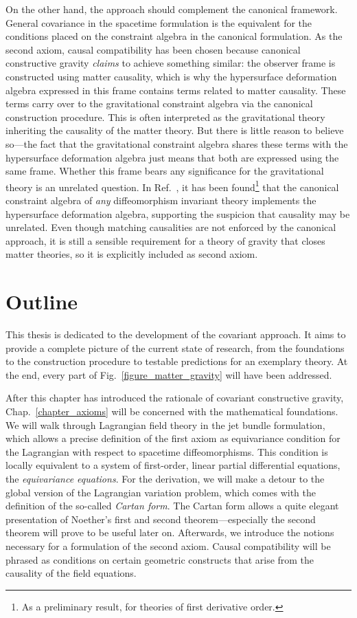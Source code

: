 On the other hand, the approach should complement the canonical framework. General covariance in the spacetime formulation is the equivalent for the conditions placed on the constraint algebra in the canonical formulation. As the second axiom, causal compatibility has been chosen because canonical constructive gravity \emph{claims} to achieve something similar: the observer frame is constructed using matter causality, which is why the hypersurface deformation algebra expressed in this frame contains terms related to matter causality. These terms carry over to the gravitational constraint algebra via the canonical construction procedure. This is often interpreted as the gravitational theory inheriting the causality of the matter theory. But there is little reason to believe so---the fact that the gravitational constraint algebra shares these terms with the hypersurface deformation algebra just means that both are expressed using the same frame. Whether this frame bears any significance for the gravitational theory is an unrelated question. In Ref.\ \cite{Reinhart_2019}, it has been found\footnote{As a preliminary result, for theories of first derivative order.} that the canonical constraint algebra of \emph{any} diffeomorphism invariant theory implements the hypersurface deformation algebra, supporting the suspicion that causality may be unrelated. Even though matching causalities are not enforced by the canonical approach, it is still a sensible requirement for a theory of gravity that closes matter theories, so it is explicitly included as second axiom.

\section{Outline}

This thesis is dedicated to the development of the covariant approach. It aims to provide a complete picture of the current state of research, from the foundations to the construction procedure to testable predictions for an exemplary theory. At the end, every part of Fig.~\ref{figure_matter_gravity} will have been addressed.

After this chapter has introduced the rationale of covariant constructive gravity, Chap.~\ref{chapter_axioms} will be concerned with the mathematical foundations. We will walk through Lagrangian field theory in the jet bundle formulation, which allows a precise definition of the first axiom as equivariance condition for the Lagrangian with respect to spacetime diffeomorphisms. This condition is locally equivalent to a system of first-order, linear partial differential equations, the \emph{equivariance equations}. For the derivation, we will make a detour to the global version of the Lagrangian variation problem, which comes with the definition of the so-called \emph{Cartan form}. The Cartan form allows a quite elegant presentation of Noether's first and second theorem---especially the second theorem will prove to be useful later on. Afterwards, we introduce the notions necessary for a formulation of the second axiom. Causal compatibility will be phrased as conditions on certain geometric constructs that arise from the causality of the field equations.

